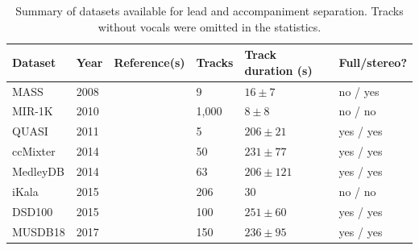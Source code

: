 \begin{table}[htbp]
	\centering
	\caption{Summary of datasets available for lead and accompaniment separation. Tracks without vocals were omitted in the statistics.}
	\label{tab:datasets}
		\begin{tabular}{l l l l l l}
			\hline
			\textbf{Dataset} & \textbf{Year} & \textbf{Reference(s)} & \textbf{Tracks} & \textbf{Track duration (s)} & \textbf{Full/stereo?}\\
			\hline
			MASS & 2008 & \cite{MTGMASSdb} & 9 & $16 \pm 7$ & no / yes \\
			MIR-1K & 2010 & \cite{hsu10} & 1,000 & $8 \pm 8$ & no / no \\
			QUASI & 2011 & \cite{liutkus11,vincent12} & 5 & $206 \pm 21$ & yes / yes \\
			ccMixter & 2014 & \cite{liutkus142} & 50 & $231 \pm 77 $ & yes / yes \\
			MedleyDB & 2014 & \cite{bittner14} & 63 & $206 \pm 121$ & yes / yes \\
			iKala & 2015 & \cite{chan15} & 206 & 30 & no / no \\
			DSD100 & 2015 & \cite{ono15} & 100 & $251 \pm 60$ & yes / yes \\
      MUSDB18 & 2017 & \cite{rafii17} & 150 & $236 \pm 95$ & yes / yes \\
			\hline
		\end{tabular}
\end{table}
